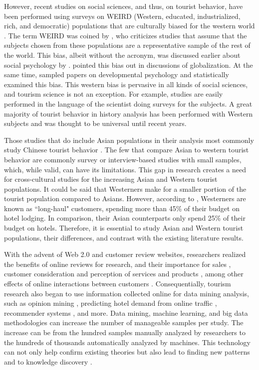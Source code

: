 \documentclass[smallextended,natbib]{svjour3}       %
\begin{document}
  However, recent studies on social sciences, and thus, on tourist behavior, have been performed using surveys on WEIRD (Western, educated, industrialized, rich, and democratic) populations that are culturally biased for the western world \cite[][]{nielsen2017}. The term WEIRD was coined by \cite{henrich2010weirdest}, who criticizes studies that assume that the subjects chosen from these populations are a representative sample of the rest of the world. This bias, albeit without the acronym, was discussed earlier about social psychology by \cite{hogan1978biases}. \cite{guaratne2009} pointed this bias out in discussions of globalization. At the same time, \cite{nielsen2017} sampled papers on developmental psychology and statistically examined this bias. This western bias is pervasive in all kinds of social sciences, and tourism science is not an exception. For example, studies are easily performed in the language of the scientist doing surveys for the subjects. A great majority of tourist behavior in history analysis has been performed with Western subjects and was thought to be universal until recent years.

  Those studies that do include Asian populations in their analysis most commonly study Chinese tourist behavior \cite[e.g.][]{liu2019, chang2010, dongyang2015}. The few that compare Asian to western tourist behavior \cite[e.g.][]{choi2000} are commonly survey or interview-based studies with small samples, which, while valid, can have its limitations. This gap in research creates a need for cross-cultural studies for the increasing Asian and Western tourist populations. It could be said that Westerners make for a smaller portion of the tourist population compared to Asians. However, according to \cite{choi2000}, Westerners are known as ``long-haul" customers, spending more than 45\% of their budget on hotel lodging. In comparison, their Asian counterparts only spend 25\% of their budget on hotels. Therefore, it is essential to study Asian and Western tourist populations, their differences, and contrast with the existing literature results.

  With the advent of Web 2.0 and customer review websites, researchers realized the benefits of online reviews for research, and their importance for sales  \cite[][]{ye2009, basuroy2003}, customer consideration \cite[][]{vermeulen2009} and perception of services and products \cite[][]{browning2013}, among other effects of online interactions between customers \cite[e.g.][]{xiang2010, ren2019}. Consequentially, tourism research also began to use information collected online for data mining analysis, such as opinion mining \cite[e.g.][]{hu2017436}, predicting hotel demand from online traffic \cite[][]{yang2014}, recommender systems \cite[e.g.][]{loh2003}, and more. Data mining, machine learning, and big data methodologies can increase the number of manageable samples per study. The increase can be from the hundred samples manually analyzed by researchers to the hundreds of thousands automatically analyzed by machines. This technology can not only help confirm existing theories but also lead to finding new patterns and to knowledge discovery \cite[][]{fayyad1996data}. 
\end{document}
